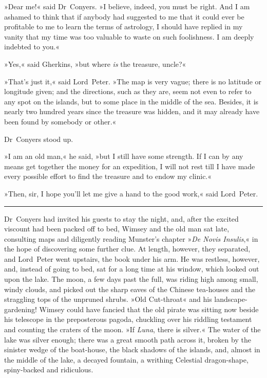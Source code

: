 »Dear me!« said Dr~Conyers. »I believe, indeed, you must be right. And I am ashamed to think that if anybody had suggested to me that it could ever be profitable to me to learn the terms of astrology, I should have replied in my vanity that my time was too valuable to waste on such foolishness. I am deeply indebted to you.«

»Yes,« said Gherkins, »but where \textit{is} the treasure, uncle?«

»That's just it,« said Lord~Peter. »The map is very vague; there is no latitude or longitude given; and the directions, such as they are, seem not even to refer to any spot on the islands, but to some place in the middle of the sea. Besides, it is nearly two hundred years since the treasure was hidden, and it may already have been found by somebody or other.«

Dr~Conyers stood up.

»I am an old man,« he said, »but I still have some strength. If I can by any means get together the money for an expedition, I will not rest till I have made every possible effort to find the treasure and to endow my clinic.«

»Then, sir, I hope you'll let me give a hand to the good work,« said Lord~Peter.

\noindent\hfil\rule{0.5\textwidth}{.4pt}\hfil 


Dr~Conyers had invited his guests to stay the night, and, after the excited viscount had been packed off to bed, Wimsey and the old man sat late, consulting maps and diligently reading Munster's chapter »\textit{De Novis Insulis},« in the hope of discovering some further clue. At length, however, they separated, and Lord~Peter went upstairs, the book under his arm. He was restless, however, and, instead of going to bed, sat for a long time at his window, which looked out upon the lake. The moon, a few days past the full, was riding high among small, windy clouds, and picked out the sharp eaves of the Chinese tea-houses and the straggling tops of the unpruned shrubs. »Old Cut-throat« and his landscape-gardening! Wimsey could have fancied that the old pirate was sitting now beside his telescope in the preposterous pagoda, chuckling over his riddling testament and counting the craters of the moon. »If \textit{Luna}, there is silver.« The water of the lake was silver enough; there was a great smooth path across it, broken by the sinister wedge of the boat-house, the black shadows of the islands, and, almost in the middle of the lake, a decayed fountain, a writhing Celestial dragon-shape, spiny-backed and ridiculous.

